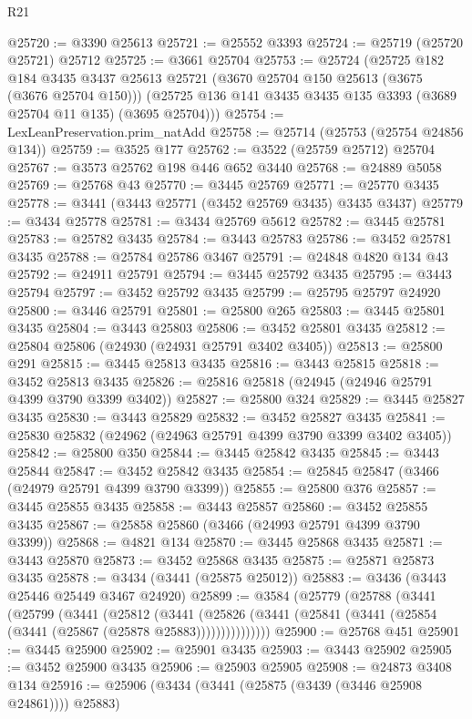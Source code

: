 \begin{lexlean}{R21}
\begin{coremodule}
@25720 := @3390 @25613
@25721 := @25552 @3393
@25724 := @25719 (@25720 @25721) @25712
@25725 := @3661 @25704
@25753 := @25724
    (@25725
      @182
      @184
      @3435
      @3437
      @25613
      @25721
      (@3670 @25704 @150 @25613 (@3675 (@3676 @25704 @150)))
      (@25725 @136 @141 @3435 @3435 @135 @3393 (@3689 @25704 @11 @135) (@3695 @25704)))
@25754 := LexLeanPreservation.prim_natAdd
@25758 := @25714 (@25753 (@25754 @24856 @134))
@25759 := @3525 @177
@25762 := @3522 (@25759 @25712) @25704
@25767 := @3573 @25762 @198 @446 @652 @3440
@25768 := @24889 @5058
@25769 := @25768 @43
@25770 := @3445 @25769
@25771 := @25770 @3435
@25778 := @3441 (@3443 @25771 (@3452 @25769 @3435) @3435 @3437)
@25779 := @3434 @25778
@25781 := @3434 @25769 @5612
@25782 := @3445 @25781
@25783 := @25782 @3435
@25784 := @3443 @25783
@25786 := @3452 @25781 @3435
@25788 := @25784 @25786 @3467
@25791 := @24848 @4820 @134 @43
@25792 := @24911 @25791
@25794 := @3445 @25792 @3435
@25795 := @3443 @25794
@25797 := @3452 @25792 @3435
@25799 := @25795 @25797 @24920
@25800 := @3446 @25791
@25801 := @25800 @265
@25803 := @3445 @25801 @3435
@25804 := @3443 @25803
@25806 := @3452 @25801 @3435
@25812 := @25804 @25806 (@24930 (@24931 @25791 @3402 @3405))
@25813 := @25800 @291
@25815 := @3445 @25813 @3435
@25816 := @3443 @25815
@25818 := @3452 @25813 @3435
@25826 := @25816 @25818 (@24945 (@24946 @25791 @4399 @3790 @3399 @3402))
@25827 := @25800 @324
@25829 := @3445 @25827 @3435
@25830 := @3443 @25829
@25832 := @3452 @25827 @3435
@25841 := @25830 @25832 (@24962 (@24963 @25791 @4399 @3790 @3399 @3402 @3405))
@25842 := @25800 @350
@25844 := @3445 @25842 @3435
@25845 := @3443 @25844
@25847 := @3452 @25842 @3435
@25854 := @25845 @25847 (@3466 (@24979 @25791 @4399 @3790 @3399))
@25855 := @25800 @376
@25857 := @3445 @25855 @3435
@25858 := @3443 @25857
@25860 := @3452 @25855 @3435
@25867 := @25858 @25860 (@3466 (@24993 @25791 @4399 @3790 @3399))
@25868 := @4821 @134
@25870 := @3445 @25868 @3435
@25871 := @3443 @25870
@25873 := @3452 @25868 @3435
@25875 := @25871 @25873 @3435
@25878 := @3434 (@3441 (@25875 @25012))
@25883 := @3436 (@3443 @25446 @25449 @3467 @24920)
@25899 := @3584
    (@25779
      (@25788
        (@3441
          (@25799
            (@3441
              (@25812
                (@3441
                  (@25826 (@3441 (@25841 (@3441 (@25854 (@3441 (@25867 (@25878 @25883)))))))))))))))
@25900 := @25768 @451
@25901 := @3445 @25900
@25902 := @25901 @3435
@25903 := @3443 @25902
@25905 := @3452 @25900 @3435
@25906 := @25903 @25905
@25908 := @24873 @3408 @134
@25916 := @25906 (@3434 (@3441 (@25875 (@3439 (@3446 @25908 @24861)))) @25883)

\end{coremodule}
\end{lexlean}
